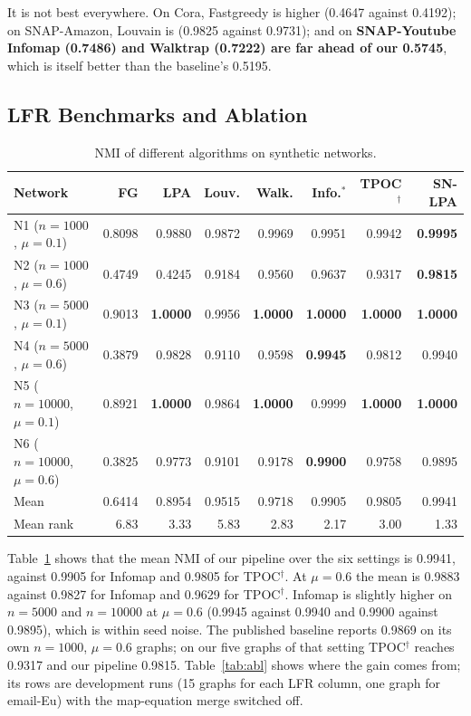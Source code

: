 \documentclass[conference]{IEEEtran}
\begin{document}
It is not best everywhere. On Cora, Fastgreedy is higher (0.4647 against 0.4192); on SNAP-Amazon, Louvain is (0.9825 against 0.9731); and on \textbf{SNAP-Youtube Infomap (0.7486) and Walktrap (0.7222) are far ahead of our 0.5745}, which is itself better than the baseline's 0.5195.

\subsection{LFR Benchmarks and Ablation}
\begin{table}[!tp]
\centering
\caption{NMI of different algorithms on synthetic networks.}
\label{tab:lfr}
\footnotesize
\begin{tabular*}{\textwidth}{@{\extracolsep{\fill}}lrrrrrrr}
\toprule
Network & FG & LPA & Louv. & Walk. & Info.$^{*}$ & TPOC$^{\dagger}$ & SN-LPA \\
\midrule
N1 ($n{=}1000$, $\mu{=}0.1$) & 0.8098 & 0.9880 & 0.9872 & 0.9969 & 0.9951 & 0.9942 & \textbf{0.9995} \\
N2 ($n{=}1000$, $\mu{=}0.6$) & 0.4749 & 0.4245 & 0.9184 & 0.9560 & 0.9637 & 0.9317 & \textbf{0.9815} \\
N3 ($n{=}5000$, $\mu{=}0.1$) & 0.9013 & \textbf{1.0000} & 0.9956 & \textbf{1.0000} & \textbf{1.0000} & \textbf{1.0000} & \textbf{1.0000} \\
N4 ($n{=}5000$, $\mu{=}0.6$) & 0.3879 & 0.9828 & 0.9110 & 0.9598 & \textbf{0.9945} & 0.9812 & 0.9940 \\
N5 ($n{=}10000$, $\mu{=}0.1$) & 0.8921 & \textbf{1.0000} & 0.9864 & \textbf{1.0000} & 0.9999 & \textbf{1.0000} & \textbf{1.0000} \\
N6 ($n{=}10000$, $\mu{=}0.6$) & 0.3825 & 0.9773 & 0.9101 & 0.9178 & \textbf{0.9900} & 0.9758 & 0.9895 \\
\midrule
Mean & 0.6414 & 0.8954 & 0.9515 & 0.9718 & 0.9905 & 0.9805 & 0.9941 \\
Mean rank & 6.83 & 3.33 & 5.83 & 2.83 & 2.17 & 3.00 & 1.33 \\
\bottomrule
\end{tabular*}
\end{table}
Table~\ref{tab:lfr} shows that the mean NMI of our pipeline over the six settings is 0.9941, against 0.9905 for Infomap and 0.9805 for TPOC$^{\dagger}$. At $\mu{=}0.6$ the mean is 0.9883 against 0.9827 for Infomap and 0.9629 for TPOC$^{\dagger}$. Infomap is slightly higher on $n{=}5000$ and $n{=}10000$ at $\mu{=}0.6$ (0.9945 against 0.9940 and 0.9900 against 0.9895), which is within seed noise. The published baseline reports 0.9869 on its own $n{=}1000$, $\mu{=}0.6$ graphs; on our five graphs of that setting TPOC$^{\dagger}$ reaches 0.9317 and our pipeline 0.9815. Table~\ref{tab:abl} shows where the gain comes from; its rows are development runs (15 graphs for each LFR column, one graph for email-Eu) with the map-equation merge switched off.
\end{document}
